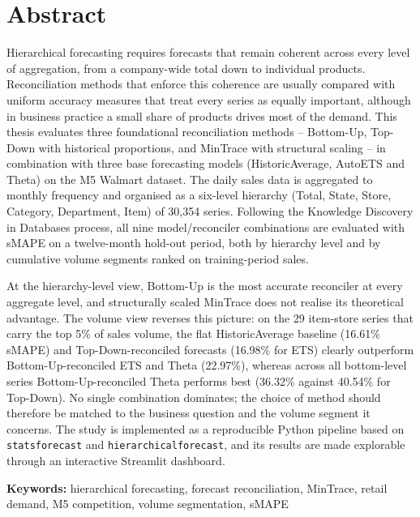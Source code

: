 %
%
%

\chapter*{Abstract}

Hierarchical forecasting requires forecasts that remain coherent across every level of aggregation, from a company-wide total down to individual products. Reconciliation methods that enforce this coherence are usually compared with uniform accuracy measures that treat every series as equally important, although in business practice a small share of products drives most of the demand. This thesis evaluates three foundational reconciliation methods -- Bottom-Up, Top-Down with historical proportions, and MinTrace with structural scaling -- in combination with three base forecasting models (HistoricAverage, AutoETS and Theta) on the M5 Walmart dataset. The daily sales data is aggregated to monthly frequency and organised as a six-level hierarchy (Total, State, Store, Category, Department, Item) of 30,354 series. Following the Knowledge Discovery in Databases process, all nine model/reconciler combinations are evaluated with sMAPE on a twelve-month hold-out period, both by hierarchy level and by cumulative volume segments ranked on training-period sales.

At the hierarchy-level view, Bottom-Up is the most accurate reconciler at every aggregate level, and structurally scaled MinTrace does not realise its theoretical advantage. The volume view reverses this picture: on the 29 item-store series that carry the top 5\% of sales volume, the flat HistoricAverage baseline (16.61\% sMAPE) and Top-Down-reconciled forecasts (16.98\% for ETS) clearly outperform Bottom-Up-reconciled ETS and Theta (22.97\%), whereas across all bottom-level series Bottom-Up-reconciled Theta performs best (36.32\% against 40.54\% for Top-Down). No single combination dominates; the choice of method should therefore be matched to the business question and the volume segment it concerns. The study is implemented as a reproducible Python pipeline based on \texttt{statsforecast} and \texttt{hierarchicalforecast}, and its results are made explorable through an interactive Streamlit dashboard.

\vspace{0.5cm}
\noindent\textbf{Keywords:} hierarchical forecasting, forecast reconciliation, MinTrace, retail demand, M5 competition, volume segmentation, sMAPE

